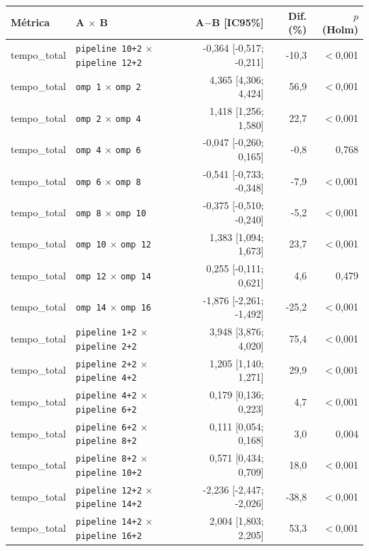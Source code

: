 \begin{tabular}{llrrr}
\hline
\textbf{M\'etrica} & \textbf{A $\times$ B} & \textbf{A$-$B [IC95\%]} & \textbf{Dif. (\%)} & \textbf{$p$ (Holm)} \\
\hline
tempo\_total & \texttt{pipeline 10+2} $\times$ \texttt{pipeline 12+2} & -0,364 [-0,517; -0,211] & -10,3 & $<$0,001 \\
tempo\_total & \texttt{omp 1} $\times$ \texttt{omp 2} & 4,365 [4,306; 4,424] & 56,9 & $<$0,001 \\
tempo\_total & \texttt{omp 2} $\times$ \texttt{omp 4} & 1,418 [1,256; 1,580] & 22,7 & $<$0,001 \\
tempo\_total & \texttt{omp 4} $\times$ \texttt{omp 6} & -0,047 [-0,260; 0,165] & -0,8 & 0,768 \\
tempo\_total & \texttt{omp 6} $\times$ \texttt{omp 8} & -0,541 [-0,733; -0,348] & -7,9 & $<$0,001 \\
tempo\_total & \texttt{omp 8} $\times$ \texttt{omp 10} & -0,375 [-0,510; -0,240] & -5,2 & $<$0,001 \\
tempo\_total & \texttt{omp 10} $\times$ \texttt{omp 12} & 1,383 [1,094; 1,673] & 23,7 & $<$0,001 \\
tempo\_total & \texttt{omp 12} $\times$ \texttt{omp 14} & 0,255 [-0,111; 0,621] & 4,6 & 0,479 \\
tempo\_total & \texttt{omp 14} $\times$ \texttt{omp 16} & -1,876 [-2,261; -1,492] & -25,2 & $<$0,001 \\
tempo\_total & \texttt{pipeline 1+2} $\times$ \texttt{pipeline 2+2} & 3,948 [3,876; 4,020] & 75,4 & $<$0,001 \\
tempo\_total & \texttt{pipeline 2+2} $\times$ \texttt{pipeline 4+2} & 1,205 [1,140; 1,271] & 29,9 & $<$0,001 \\
tempo\_total & \texttt{pipeline 4+2} $\times$ \texttt{pipeline 6+2} & 0,179 [0,136; 0,223] & 4,7 & $<$0,001 \\
tempo\_total & \texttt{pipeline 6+2} $\times$ \texttt{pipeline 8+2} & 0,111 [0,054; 0,168] & 3,0 & 0,004 \\
tempo\_total & \texttt{pipeline 8+2} $\times$ \texttt{pipeline 10+2} & 0,571 [0,434; 0,709] & 18,0 & $<$0,001 \\
tempo\_total & \texttt{pipeline 12+2} $\times$ \texttt{pipeline 14+2} & -2,236 [-2,447; -2,026] & -38,8 & $<$0,001 \\
tempo\_total & \texttt{pipeline 14+2} $\times$ \texttt{pipeline 16+2} & 2,004 [1,803; 2,205] & 53,3 & $<$0,001 \\

\end{tabular}
